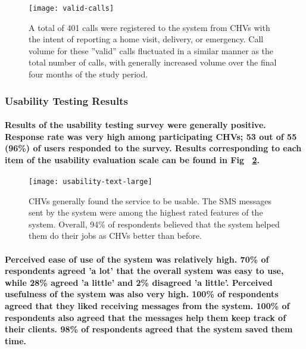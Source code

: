 \begin{figure}[h]
	\begin{center}
	\texttt{[image: valid-calls]}
	\end{center}
	\caption[Valid CHV Calls]{A total of 401 calls were registered to the system from CHVs with the intent of reporting a home visit, delivery, or emergency. Call volume for these ''valid'' calls fluctuated in a similar manner as the total number of calls, with generally increased volume over the final four months of the study period.}
	\label{fig:validCHVcalls}
\end{figure}

\subsubsection{Usability Testing Results}
\paragraph{ Results of the usability testing survey were generally positive. Response rate was very high among participating CHVs; 53 out of 55 (96\%) of users responded to the survey. Results corresponding to each item of the usability evaluation scale can be found in Fig ~\ref{fig:barchart}.} 

\begin{figure}[h]
	\begin{center}
	\texttt{[image: usability-text-large]}
	\end{center}
	\caption[Usability survey results]{CHVs generally found the service to be usable. The SMS messages sent by the system were among the highest rated features of the system. Overall, 94\% of respondents believed that the system helped them do their jobs as CHVs better than before.}
	\label{fig:barchart}
\end{figure}

\paragraph{ Perceived ease of use of the system was relatively high. 70\% of respondents agreed 'a lot' that the overall system was easy to use, while 28\%  agreed 'a little' and 2\%  disagreed 'a little'. Perceived usefulness of the system was also very high. 100\% of respondents agreed that they liked receiving messages from the system. 100\% of respondents also agreed that the messages help them keep track of their clients. 98\% of respondents agreed that the system saved them time.}

